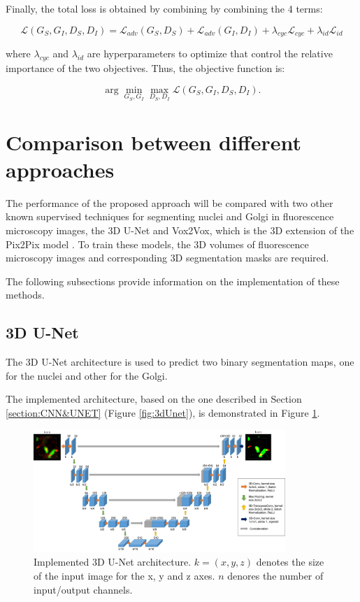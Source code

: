 Finally, the total loss is obtained by combining by combining the 4 terms:

\begin{equation}
\label{eq:total-cyclegan-loss}
    \mathcal{L}(G_{S},G_{I},D_S,D_I) = \mathcal{L}_{adv}(G_{S},D_S) + \mathcal{L}_{adv}(G_{I},D_I) + \lambda_{cyc} \mathcal{L}_{cyc} + \lambda_{id} \mathcal{L}_{id}
\end{equation}

\noindent where $\lambda_{cyc}$ and $\lambda_{id}$ are hyperparameters to optimize that control the relative importance of the two objectives. Thus, the objective function is:

\begin{equation}
    \arg \min_{G_{S},G_{I}}\max_{D_S,D_I} \mathcal{L}(G_{S},G_{I},D_S,D_I).
\end{equation}

\section{Comparison between different approaches}
\label{section:comparison}

The performance of the proposed approach will be compared with two other known supervised techniques for segmenting nuclei and Golgi in fluorescence microscopy images, the \ac{3D} U-Net \cite{Unet:3D} and Vox2Vox, which is the \ac{3D} extension of the Pix2Pix model \cite{isola2018imagetoimage}. To train these models, the \ac{3D} volumes of fluorescence microscopy images and corresponding \ac{3D} segmentation masks are required.

The following subsections provide information on the implementation of these methods.

\subsection{3D U-Net}

The \ac{3D} U-Net architecture is used to predict two binary segmentation maps, one for the nuclei and other for the Golgi.

The implemented architecture, based on the one described in Section \ref{section:CNN&UNET} (Figure \ref{fig:3dUnet}), is demonstrated in Figure \ref{fig:y-unet-3d}.

\begin{figure}[!htb]
  \centering
  \includegraphics[width=0.85\textwidth]{Images/Picture1.jpg}
  \caption{Implemented \ac{3D} U-Net architecture. $k=(x,y,z)$ denotes the size of the input image for the x, y and z axes. $n$ denores the number of input/output channels.}
  \label{fig:y-unet-3d}
\end{figure}

